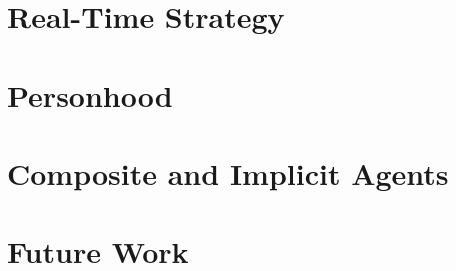 \documentclass[12pt]{article}
\theoremstyle{definition}
\begin{document}
\section{Real-Time Strategy}
\label{sec:games}


\section{Personhood}
\label{sec:persons}


\section{Composite and Implicit Agents}
\label{sec:composites}




\section{Future Work}
\label{sec:future}



\end{document}
